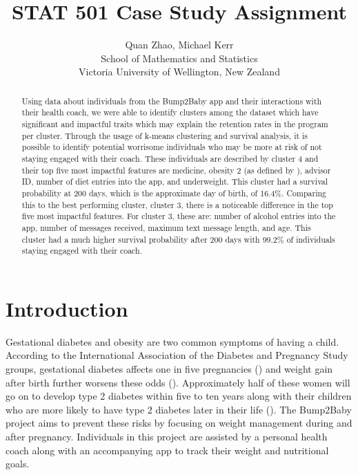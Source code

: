 \documentclass[12pt]{article}
\title{STAT 501 Case Study Assignment}
\author{Quan Zhao, Michael Kerr\\
School of Mathematics and Statistics\\ Victoria University of Wellington, New Zealand}
\begin{document}
\maketitle

\begin{abstract}
  Using data about individuals from the Bump2Baby app and their interactions with their health coach, we were able to identify clusters among the dataset which have significant and impactful traits which may explain the retention rates in the program per cluster. Through the usage of k-means clustering and survival analysis, it is possible to identify potential worrisome individuals who may be more at risk of not staying engaged with their coach. These individuals are described by cluster 4 and their top five most impactful features are medicine, obesity 2 (as defined by \cite{WHO_BMI}), advisor ID, number of diet entries into the app, and underweight. This cluster had a survival probability at 200 days, which is the approximate day of birth, of 16.4\%. Comparing this to the best performing cluster, cluster 3, there is a noticeable difference in the top five most impactful features. For cluster 3, these are: number of alcohol entries into the app, number of messages received, maximum text message length, and age. This cluster had a much higher survival probability after 200 days with 99.2\% of individuals staying engaged with their coach.
\end{abstract}


\tableofcontents


\setlength{\baselineskip}{0.25in} %





\newpage  %
\section{Introduction}
		
		\label{s.intro}
		
		Gestational diabetes and obesity are two common symptoms of having a child. According to the International Association of the Diabetes and Pregnancy Study groups, gestational diabetes affects one in five pregnancies (\cite{10.2337/dc11-1641}) and weight gain after birth further worsens these odds (\cite{nu11040922}). Approximately half of these women will go on to develop type 2 diabetes within five to ten years along with their children who are more likely to have type 2 diabetes later in their life (\cite{Vounzoulakim1361}). The Bump2Baby project aims to prevent these risks by focusing on weight management during and after pregnancy. Individuals in this project are assisted by a personal health coach along with an accompanying app to track their weight and nutritional goals.
		
\end{document}
